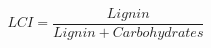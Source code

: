 \documentclass[authoryear,preprint,review,12pt]{elsarticle}
\begin{document}
                                                                                                                                                                                                                                                                                                                                                                                                                                                                                                                                                                                                                                                                                                                                                                                                                                                                                                                                                                                                                                                                                                                              \begin{equation}
                                                                                                                                                                                                                                                                                                                                                                                                                                                                                                                                                                                                                                                                                                                                                                                                                                                                                                                                                                                                                                                                                                                              LCI=\frac{Lignin}{Lignin + Carbohydrates}

\end{equation}
\end{document}
